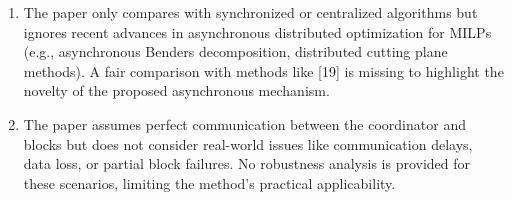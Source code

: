 \documentclass[11pt]{article}
\begin{document}
\begin{enumerate}
\begin{enumerate}
        \item The paper claims the algorithm `is free of sophisticated stabilization techniques' but provides no proof of stability—e.g., how to prevent divergence caused by outdated dual variable $\beta$ in asynchronous updates, or how to handle cases where block subproblems return suboptimal solutions.
    \end{enumerate}
    \item The paper only compares with synchronized or centralized algorithms but ignores recent advances in asynchronous distributed optimization for MILPs (e.g., asynchronous Benders decomposition, distributed cutting plane methods). A fair comparison with methods like [19] is missing to highlight the novelty of the proposed asynchronous mechanism.
    \item The paper assumes perfect communication between the coordinator and blocks but does not consider real-world issues like communication delays, data loss, or partial block failures. No robustness analysis is provided for these scenarios, limiting the method's practical applicability.
\end{enumerate}
\end{document}
